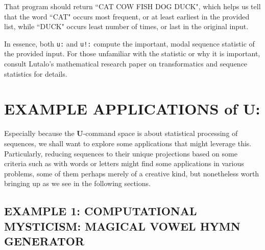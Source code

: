 \documentclass[a4paper, 18pt]{book} %
\begin{document}
{{{\vspace{1em}


That program should return ``CAT COW FISH DOG DUCK", which helps us tell that the word ``CAT" occurs most frequent, or at least earliest in the provided list, while ``DUCK" occurs least number of times, or last in the original input.


\vspace{2em}


In essence, both \texttt{u:} and \texttt{u!:} compute the important, modal sequence statistic of the provided input. For those unfamiliar with the statistic or why it is important, consult Lutalo’s mathematical research paper\cite{transformatics} on transformatics and sequence statistics for details.

 
\section{EXAMPLE APPLICATIONS of U:}
\label{SECEXAMPU}

  
Especially because the \textbf{U}-command space is about statistical processing of sequences, we shall want to explore some applications that might leverage this. Particularly, reducing sequences to their unique projections based on some criteria such as with words or letters might find some applications in various problems, some of them perhaps merely of a creative kind, but nonetheless worth bringing up as we see in the following sections.



\subsection{EXAMPLE 1: \textbf{COMPUTATIONAL MYSTICISM:} MAGICAL VOWEL HYMN GENERATOR}
\label{SECEXAMP1U}


}}}
\end{document}
